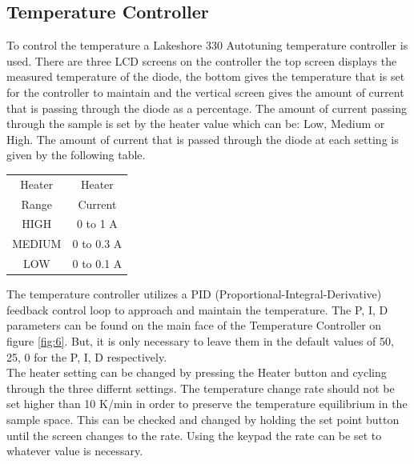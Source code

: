 \documentclass[twocolumn]{article}
\begin{document}
\subsection{Temperature Controller}
To control the temperature a Lakeshore 330 Autotuning temperature controller is 
used. There are three LCD screens on the controller the top screen displays the 
measured temperature of the diode, the bottom gives the temperature that is 
set for the controller to maintain and the vertical screen gives the amount of 
current that is passing through the diode as a percentage. The amount of 
current passing through the sample is set by the heater value which can be: 
Low, Medium or High. The amount of current that is passed through the diode at 
each setting is given by the following table.
\begin{minipage}{\linewidth}
\label{tbl:1}
\Centering
\begin{tabular}{|c|c|}
\hline
Heater & Heater \\ Range & Current \\ \hline
HIGH & 0 to 1 A  \\ \hline
MEDIUM & 0 to 0.3 A \\ \hline
LOW & 0 to 0.1 A \\ \hline
\end{tabular}
\end{minipage}
The temperature controller utilizes a PID (Proportional-Integral-Derivative) 
feedback control loop to approach and maintain the temperature. The P, I, D 
parameters can be found on the main face of the Temperature Controller on 
figure \ref{fig:6}. But, it is only necessary to leave them in the default 
values of 50, 25, 0 for the P, I, D respectively.
\\
The heater setting can be changed by pressing the Heater button and cycling 
through the three differnt settings. The temperature change rate should not be 
set higher than 10 K/min in order to preserve the temperature equilibrium in 
the sample space. This can be checked and changed by holding the set point 
button until the screen changes to the rate. Using the keypad the rate can be 
set to whatever value is necessary.
\end{document}
